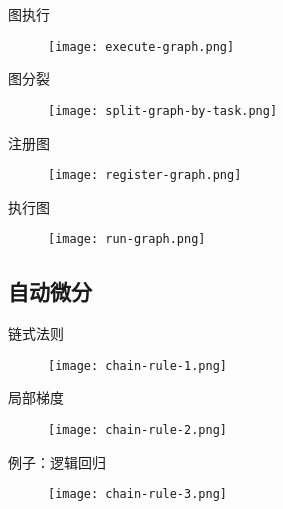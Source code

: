 \begin{frame}{图执行}
  \begin{figure}
    \centering
    \texttt{[image: execute-graph.png]}
  \end{figure}
\end{frame}

\begin{frame}{图分裂}
  \begin{figure}
    \centering
    \texttt{[image: split-graph-by-task.png]}
  \end{figure}
\end{frame}

\begin{frame}{注册图}
  \begin{figure}
    \centering
    \texttt{[image: register-graph.png]}
  \end{figure}
\end{frame}

\begin{frame}{执行图}
  \begin{figure}
    \centering
    \texttt{[image: run-graph.png]}
  \end{figure}
\end{frame}

\subsection{自动微分}

\begin{frame}{链式法则}
  \begin{figure}
    \centering
    \texttt{[image: chain-rule-1.png]}
  \end{figure}
\end{frame}

\begin{frame}{局部梯度}
  \begin{figure}
    \centering
    \texttt{[image: chain-rule-2.png]}
  \end{figure}
\end{frame}

\begin{frame}{例子：逻辑回归}
  \begin{figure}
    \centering
    \texttt{[image: chain-rule-3.png]}
  \end{figure}
\end{frame}


